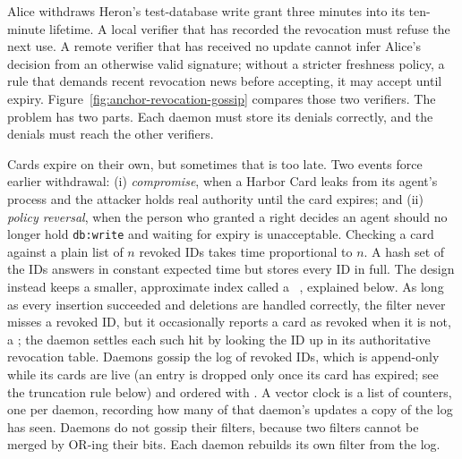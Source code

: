 \documentclass[11pt,a4paper]{article}
\theoremstyle{definition}
\begin{document}
%
Alice withdraws Heron's test-database write grant three minutes into its
ten-minute lifetime. A local verifier that has recorded the revocation must
refuse the next use. A remote verifier that has received no update cannot
infer Alice's decision from an otherwise valid signature; without a stricter
freshness policy, a rule that demands recent revocation news before accepting,
it may accept until expiry. Figure~\ref{fig:anchor-revocation-gossip}
compares those two verifiers. The problem has two parts. Each daemon must
store its denials correctly, and the denials must reach the other verifiers.

Cards expire on their own, but sometimes that is too late. Two events force earlier withdrawal: (i) \emph{compromise}, when a Harbor Card leaks from its agent's process and the attacker holds real authority until the card expires; and (ii) \emph{policy reversal}, when the person who granted a right decides an agent should no longer hold \texttt{db:write} and waiting for expiry is unacceptable. Checking a card against a plain list of $n$ revoked IDs takes time proportional to $n$. A hash set of the IDs answers in constant expected time but stores every ID in full. The design instead keeps a smaller, approximate index called a ~, explained below. As long as every insertion succeeded and deletions are handled correctly, the filter never misses a revoked ID, but it occasionally reports a card as revoked when it is not, a ; the daemon settles each such hit by looking the ID up in its authoritative revocation table. Daemons gossip the log of revoked IDs, which is append-only while its cards are live (an entry is dropped only once its card has expired; see the truncation rule below) and ordered with . A vector clock is a list of counters, one per daemon, recording how many of that daemon's updates a copy of the log has seen. Daemons do not gossip their filters, because two filters cannot be merged by OR-ing their bits. Each daemon rebuilds its own filter from the log.
\end{document}
